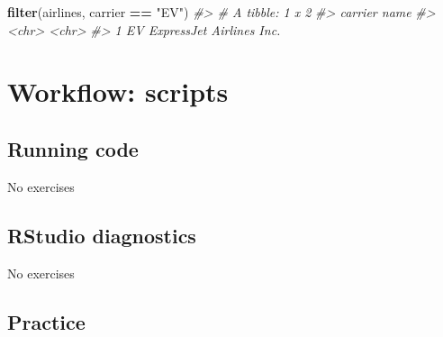 \documentclass[]{book}
\newenvironment{Shaded}{\begin{snugshade}}{\end{snugshade}}
\newcommand{\CommentTok}[1]{\textcolor[rgb]{0.56,0.35,0.01}{\textit{#1}}}
\newcommand{\DataTypeTok}[1]{\textcolor[rgb]{0.13,0.29,0.53}{#1}}
\newcommand{\KeywordTok}[1]{\textcolor[rgb]{0.13,0.29,0.53}{\textbf{#1}}}
\newcommand{\NormalTok}[1]{#1}
\newcommand{\OperatorTok}[1]{\textcolor[rgb]{0.81,0.36,0.00}{\textbf{#1}}}
\newcommand{\OtherTok}[1]{\textcolor[rgb]{0.56,0.35,0.01}{#1}}
\newcommand{\StringTok}[1]{\textcolor[rgb]{0.31,0.60,0.02}{#1}}
\theoremstyle{plain}
\theoremstyle{remark}
\theoremstyle{definition}
\theoremstyle{definition}
\theoremstyle{definition}
\theoremstyle{remark}
\begin{document}
\begin{Shaded}
\end{Shaded}

\begin{Shaded}
\begin{Highlighting}[]
\KeywordTok{filter}\NormalTok{(airlines, carrier }\OperatorTok{==}\StringTok{ "EV"}\NormalTok{)}
\CommentTok{#> # A tibble: 1 x 2}
\CommentTok{#>   carrier name                    }
\CommentTok{#>   <chr>   <chr>                   }
\CommentTok{#> 1 EV      ExpressJet Airlines Inc.}
\end{Highlighting}
\end{Shaded}

\hypertarget{workflow-scripts}{%
\chapter{Workflow: scripts}\label{workflow-scripts}}

\hypertarget{running-code}{%
\section{Running code}\label{running-code}}

No exercises

\hypertarget{rstudio-diagnostics}{%
\section{RStudio diagnostics}\label{rstudio-diagnostics}}

No exercises

\hypertarget{practice-1}{%
\section{Practice}\label{practice-1}}
\end{document}

